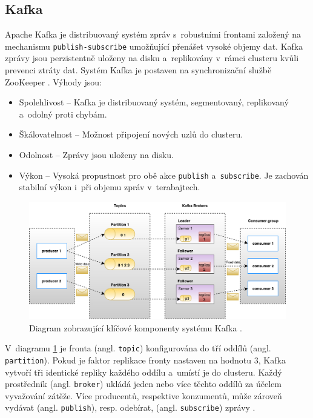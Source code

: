 \subsection{Kafka}
Apache Kafka je distribuovaný systém zpráv s~robustními frontami založený na mechanismu \texttt{publish-subscribe} umožňující přenášet vysoké objemy dat. Kafka zprávy jsou perzistentně uloženy na disku a~replikovány v~rámci clusteru kvůli prevenci ztráty dat. Systém Kafka je postaven na synchronizační službě ZooKeeper \cite{kafkaTutorialsPoint}. Výhody jsou:
\begin{itemize}
    \item Spolehlivost -- Kafka je distribuovaný systém, segmentovaný, replikovaný a~odolný proti chybám.
    
    \item Škálovatelnost -- Možnost připojení nových uzlů do clusteru.
    
    \item Odolnost -- Zprávy jsou uloženy na disku.
    
    \item Výkon -- Vysoká propustnost pro obě akce \texttt{publish} a~\texttt{subscribe}. Je zachován stabilní výkon i~při objemu zpráv v~terabajtech.
\end{itemize}

\begin{figure}[!h]
  \centering
  \includegraphics[width=15cm]{template-fig/Kafka_architecture.pdf}
  \caption{Diagram zobrazující klíčové komponenty systému Kafka \cite{kafkaTutorialsPoint}.}
  \label{FIG_KafkaArchitecture}
\end{figure}

\noindent V~diagramu \ref{FIG_KafkaArchitecture} je fronta (angl. \texttt{topic}) konfigurována do tří oddílů (angl. \texttt{partition}). Pokud je faktor replikace fronty nastaven na hodnotu 3, Kafka vytvoří tři identické repliky každého oddílu a~umístí je do clusteru. Každý prostředník (angl. \texttt{broker}) ukládá jeden nebo více těchto oddílů za účelem vyvažování zátěže. Více producentů, respektive konzumentů, může zároveň vydávat (angl. \texttt{publish}), resp. odebírat, (angl. \texttt{subscribe}) zprávy \cite{kafkaTutorialsPoint}.

